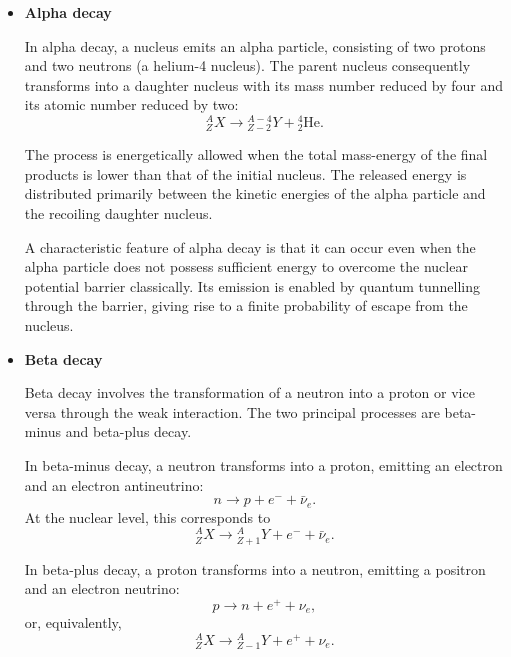 \begin{itemize}
\item{\textbf{Alpha decay}}

In alpha decay, a nucleus emits an alpha particle, consisting of two protons and two neutrons (a helium-4 nucleus). The parent nucleus consequently transforms into a daughter nucleus with its mass number reduced by four and its atomic number reduced by two:
\begin{equation}
    {}^{A}_{Z}X
    \longrightarrow
    {}^{A-4}_{Z-2}Y
    + {}^{4}_{2}\mathrm{He}.
\end{equation}

The process is energetically allowed when the total mass-energy of the final products is lower than that of the initial nucleus. The released energy is distributed primarily between the kinetic energies of the alpha particle and the recoiling daughter nucleus.

A characteristic feature of alpha decay is that it can occur even when the alpha particle does not possess sufficient energy to overcome the nuclear potential barrier classically. Its emission is enabled by quantum tunnelling through the barrier, giving rise to a finite probability of escape from the nucleus.

\item{\textbf{Beta decay}}

Beta decay involves the transformation of a neutron into a proton or vice versa through the weak interaction. The two principal processes are beta-minus and beta-plus decay.

In beta-minus decay, a neutron transforms into a proton, emitting an electron and an electron antineutrino:
\begin{equation}
    n \longrightarrow p + e^- + \bar{\nu}_e.
\end{equation}
At the nuclear level, this corresponds to
\begin{equation}
    {}^{A}_{Z}X
    \longrightarrow
    {}^{A}_{Z+1}Y + e^- + \bar{\nu}_e.
\end{equation}

In beta-plus decay, a proton transforms into a neutron, emitting a positron and an electron neutrino:
\begin{equation}
    p \longrightarrow n + e^+ + \nu_e,
\end{equation}
or, equivalently,
\begin{equation}
    {}^{A}_{Z}X
    \longrightarrow
    {}^{A}_{Z-1}Y + e^+ + \nu_e.
\end{equation}


\end{itemize}
